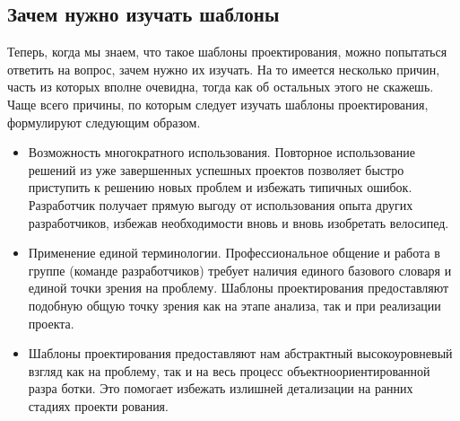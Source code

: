 \documentclass[10pt]{article}
\begin{document}
\subsection{Зачем нужно изучать шаблоны}

Теперь, когда мы знаем, что такое шаблоны проектирования, можно попытаться
ответить на вопрос, зачем нужно их изучать. На то имеется несколько причин, часть
из которых вполне очевидна, тогда как об остальных этого не скажешь.
Чаще всего причины, по которым следует изучать шаблоны проектирования,
формулируют следующим образом.
\begin{itemize}
	\item Возможность многократного использования. Повторное использование решений из
уже завершенных успешных проектов позволяет быстро приступить к решению
новых проблем и избежать типичных ошибок. Разработчик получает прямую
выгоду от использования опыта других разработчиков, избежав необходимости
вновь и вновь изобретать велосипед.
\item
Применение единой терминологии. Профессиональное общение и работа в группе
(команде разработчиков) требует наличия единого базового словаря и единой
точки зрения на проблему. Шаблоны проектирования предоставляют подобную
общую точку зрения как на этапе анализа, так и при реализации проекта.
\item 
Шаблоны проектирования предоставляют нам абстрактный высокоуровневый
взгляд как на проблему, так и на весь процесс объектноориентированной разра
ботки. Это помогает избежать излишней детализации на ранних стадиях проекти
рования.
\end{itemize}
\end{document}
